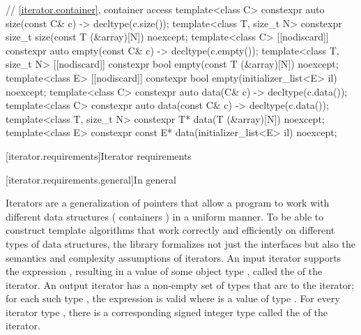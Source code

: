 \begin{codeblock}
{  // \ref{iterator.container}, container access
  template<class C> constexpr auto size(const C& c) -> decltype(c.size());
  template<class T, size_t N> constexpr size_t size(const T (&array)[N]) noexcept;
  template<class C> [[nodiscard]] constexpr auto empty(const C& c) -> decltype(c.empty());
  template<class T, size_t N> [[nodiscard]] constexpr bool empty(const T (&array)[N]) noexcept;
  template<class E> [[nodiscard]] constexpr bool empty(initializer_list<E> il) noexcept;
  template<class C> constexpr auto data(C& c) -> decltype(c.data());
  template<class C> constexpr auto data(const C& c) -> decltype(c.data());
  template<class T, size_t N> constexpr T* data(T (&array)[N]) noexcept;
  template<class E> constexpr const E* data(initializer_list<E> il) noexcept;
}
\end{codeblock}


[iterator.requirements]{Iterator requirements}

[iterator.requirements.general]{In general}

\pnum
{}%
Iterators are a generalization of pointers that allow a \Cpp{} program to work with different data structures
( containers ) in a uniform manner.
To be able to construct template algorithms that work correctly and
efficiently on different types of data structures, the library formalizes not just the interfaces but also the
semantics and complexity assumptions of iterators.
An input iterator
supports the expression
,
resulting in a value of some object type
,
called the
of the iterator.
An output iterator  has a non-empty set of types that are
 to the iterator;
for each such type , the expression 
is valid where  is a value of type .
For every iterator type
, there is a corresponding signed integer type called the
of the iterator.

